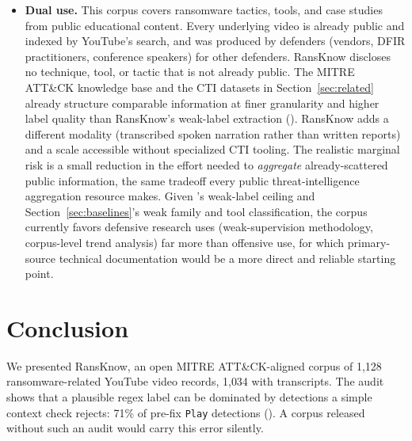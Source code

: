 \documentclass[preprint,12pt]{elsarticle}
\begin{document}
\begin{itemize}
    operators hold their own rights, and they were obtained through the
    YouTube Data API, \texttt{yt-dlp}, and audio download for Whisper
    transcription. The release contains transcript text and metadata but
    no audio or video. A video being public does not by itself grant a right to
    redistribute its speech as text, and we did not obtain permission from
    individual channels or speakers. YouTube's terms of service may also
    restrict automated collection of this kind, so re-users should check
    the terms that apply to them. The authors' CC0 dedication covers only
    the authors' own contributions (the extracted features, labels, and
    compiled metadata). It grants no re-use rights in the transcript text
    or the underlying talks, which remain with their owners and are shared
    here for research use. A rights holder can have a transcript removed
    from future releases by opening an issue on the repository or by
    contacting the corresponding author.
  \item \textbf{Dual use.} This corpus covers ransomware tactics, tools, and
    case studies from public educational content. Every underlying video is
    already public and indexed by YouTube's search, and was produced by
    defenders (vendors, DFIR practitioners, conference speakers) for other
    defenders. RansKnow discloses no technique, tool, or tactic that is not
    already public. The MITRE ATT\&CK knowledge base and the CTI datasets in
    Section~\ref{sec:related} \citep{lim2017malwaretextdb, lange2024annoctr}
    already structure comparable information at finer granularity and higher
    label quality than RansKnow's weak-label extraction
    (). RansKnow adds a different modality (transcribed
    spoken narration rather than written reports) and a scale accessible
    without specialized CTI tooling. The realistic marginal risk is a small
    reduction in the effort needed to \emph{aggregate} already-scattered public
    information, the same tradeoff every public threat-intelligence aggregation
    resource makes. Given 's weak-label ceiling and
    Section~\ref{sec:baselines}'s weak family and tool classification, the
    corpus currently favors defensive research uses (weak-supervision
    methodology, corpus-level trend analysis) far more than offensive use, for
    which primary-source technical documentation would be a more direct and
    reliable starting point.
\end{itemize}

\section{Conclusion}
\label{sec:conclusion}
We presented RansKnow, an open MITRE ATT\&CK-aligned corpus of 1{,}128
ransomware-related YouTube video records, 1{,}034 with transcripts. The
audit shows that a plausible regex label can be dominated by detections a
simple context check rejects: 71\% of pre-fix \texttt{Play} detections
(). A corpus released without such an audit would
carry this error silently.
\end{document}
